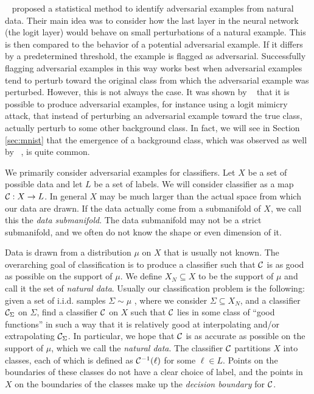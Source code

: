 ~\citet{roth19aodds} proposed a statistical method to identify adversarial examples from natural data. Their main idea was to consider how the last layer in the neural network (the logit layer) would behave on small perturbations of a natural example. %
This is then compared to the behavior of a potential adversarial example. If it differs by a predetermined threshold, the example is flagged as adversarial. Successfully flagging adversarial examples in this way works best when adversarial examples tend to perturb toward the original class from which the adversarial example was perturbed. However, this is not always the case.
It was shown by ~\citet{hosseini2019odds} that it is possible to produce adversarial examples, for instance using a logit mimicry attack, that instead of perturbing an adversarial example toward the true class, actually perturb to some other background class. In fact, we will see in Section \ref{sec:mnist} that the emergence of a background class, which was observed as well by ~\citet{roth19aodds}, is quite common. 

We primarily consider adversarial examples for classifiers.  Let $X$ be a set of possible data and let $L$ be a set of labels. We will consider classifier as a map $\mathcal{C}: X \to L$. In general $X$ may be much larger than the actual space from which our data are drawn. If the data actually come from a submanifold of $X$, we call this the \emph{data submanifold}. The data submanifold may not be a strict submanifold, and we often do not know the shape or even dimension of it.

Data is drawn from a distribution $\mu$ on $X$ that is usually not known. The overarching goal of classification is to produce a classifier such that $\mathcal{C}$ is as good as possible on the support of $\mu$. 
We define $X_N \subseteq X$ to be the support of $\mu$ and call it the set of \emph{natural data}. 
Usually our classification problem is the following: given a set of i.i.d. samples $\Sigma \sim \mu$
, where we consider $\Sigma \subseteq X_N$, 
and a classifier $\mathcal{C}_\Sigma$ on $\Sigma$, find a classifier $\mathcal{C}$ on $X$ such that $\mathcal{C}$ lies in some class of ``good functions'' in such a way that it is relatively good at interpolating and/or extrapolating $\mathcal{C}_\Sigma$. In particular, we hope that $\mathcal{C}$ is as accurate as possible on the support of $\mu$, which we call the \emph{natural data}. %
The classifier $\mathcal{C}$ partitions $X$ into classes, each of which is defined as $\mathcal{C}^{-1}(\ell)$ for some $\ell \in L$. Points on the boundaries of these classes do not have a clear choice of label, and the points in $X$ on the boundaries of the classes make up the \emph{decision boundary} for $\mathcal{C}$.

